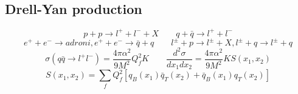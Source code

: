\documentclass[10pt, onecolumn, a4paper]{article}
\def\({\left(}
\def\){\right)}
\def\[{\left[}
\def\]{\right]}
\begin{document}
\subsection{Drell-Yan production} %
$$p+p\to l^++l^-+X \qquad q+\bar q\to l^++l^-$$
$$e^++e^-\to adroni, e^++e^- \to \bar q+q \qquad l^\pm+p\to l^\pm+X,l^\pm+q\to l^\pm+q$$
$$\sigma\(q\bar q\to l^+l^-\)=\frac{4\pi\alpha^2}{9M^2}Q_f^2K \qquad \frac{d^2\sigma}{dx_1dx_2}=\frac{4\pi\alpha^2}{9M^2}KS\(x_1,x_2\)$$
$$S\(x_1,x_2\)=\sum_f{Q_f^2\[q_B\(x_1\)\bar q_T\(x_2\)+\bar q_B\(x_1\) q_T\(x_2\)\]}$$
\end{document}
